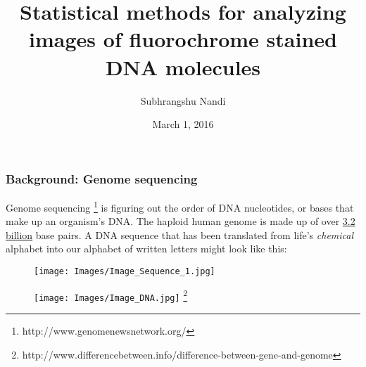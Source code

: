 \documentclass[10pt,dvipsnames,table]{beamer}
\title[Statistics for fluoroscanning]{Statistical methods for analyzing images of fluorochrome stained DNA molecules}
\author{Subhrangshu Nandi}
\institute[Prelim exam]{Preliminary Exam \\
Department of Statistics \\
University of Wisconsin-Madison}
\date{March 1, 2016}
\begin{document}
\setlength{\baselineskip}{16truept}

\frame{\maketitle}

\begin{frame}
\frametitle{Background: Genome sequencing}
Genome sequencing \footnote{http://www.genomenewsnetwork.org/} is figuring out the order of DNA nucleotides, or bases that make up an organism's DNA. The haploid human genome is made up of over {\underline{3.2 billion}} base pairs. A DNA sequence that has been translated from life's {\emph{chemical}} alphabet into our alphabet of written letters might look like this:
\begin{figure}[H]
\texttt{[image: Images/Image\_Sequence\_1.jpg]}
\end{figure}

\begin{figure}[H]
\texttt{[image: Images/Image\_DNA.jpg]} \footnote{http://www.differencebetween.info/difference-between-gene-and-genome}
\end{figure}

\note{}
\end{frame}
\end{document}
